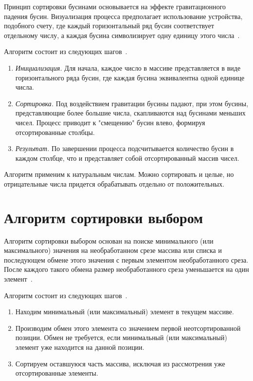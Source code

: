 Принцип сортировки бусинами основывается на эффекте гравитационного падения бусин.
Визуализация процесса предполагает использование устройства, подобного счету, где каждый горизонтальный ряд бусин соответствует отдельному числу, а каждая бусина символизирует одну единицу этого числа~\cite{article_bead}.

Алгоритм состоит из следующих шагов~\cite{article_bead}.

\begin{enumerate}
	\item \textit{Инициализация.} Для начала, каждое число в массиве представляется в виде горизонтального ряда бусин, где каждая бусина эквивалентна одной единице числа.
	\item  \textit{Сортировка.} Под воздействием гравитации бусины падают, при этом бусины, представляющие более большие числа, скапливаются над бусинами меньших чисел. Процесс приводит к "смещению" бусин влево, формируя отсортированные столбцы. 
	\item \textit{Результат.} По завершении процесса подсчитывается количество бусин в каждом столбце, что и представляет собой отсортированный массив чисел.
\end{enumerate}

Алгоритм применим к натуральным числам. Можно сортировать и целые, но отрицательные числа придется обрабатывать отдельно от положительных.

\section{Алгоритм сортировки выбором}

Алгоритм сортировки выбором основан на поиске минимального (или максимального) значения на необработанном срезе массива или списка и последующем обмене этого значения с первым элементом необработанного среза. После каждого такого обмена размер необработанного среза уменьшается на один элемент~\cite{knut}.


Алгоритм состоит из следующих шагов~\cite{knut}.

\begin{enumerate}
	\item Находим минимальный (или максимальный) элемент в текущем массиве.
	\item Производим обмен этого элемента со значением первой неотсортированной позиции. Обмен не требуется, если минимальный (или максимальный) элемент уже находится на данной позиции.
	\item Сортируем оставшуюся часть массива, исключая из рассмотрения уже отсортированные элементы.
\end{enumerate}


